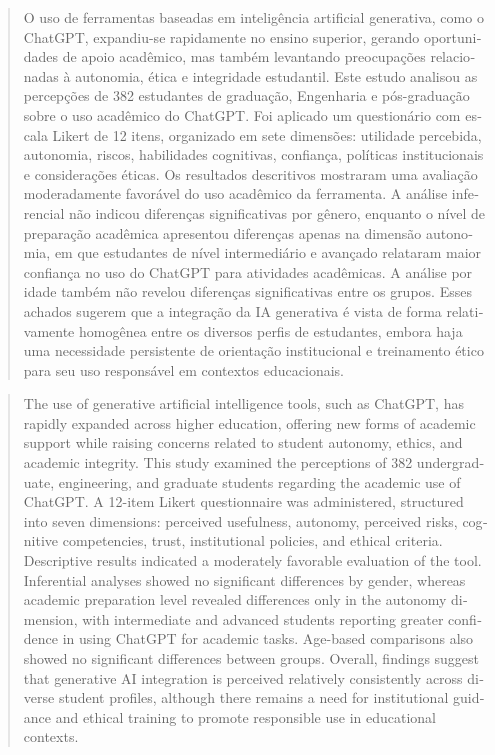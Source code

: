 \documentclass[spanish]{textolivre}
\begin{document}
\begin{polyabstract}
\begin{portuguese}
\begin{abstract}
O uso de ferramentas baseadas em inteligência artificial generativa, como o ChatGPT, expandiu-se rapidamente no ensino superior, gerando oportunidades de apoio acadêmico, mas também levantando preocupações relacionadas à autonomia, ética e integridade estudantil. Este estudo analisou as percepções de 382 estudantes de graduação, Engenharia e pós-graduação sobre o uso acadêmico do ChatGPT. Foi aplicado um questionário com escala Likert de 12 itens, organizado em sete dimensões: utilidade percebida, autonomia, riscos, habilidades cognitivas, confiança, políticas institucionais e considerações éticas. Os resultados descritivos mostraram uma avaliação moderadamente favorável do uso acadêmico da ferramenta. A análise inferencial não indicou diferenças significativas por gênero, enquanto o nível de preparação acadêmica apresentou diferenças apenas na dimensão autonomia, em que estudantes de nível intermediário e avançado relataram maior confiança no uso do ChatGPT para atividades acadêmicas. A análise por idade também não revelou diferenças significativas entre os grupos. Esses achados sugerem que a integração da IA generativa é vista de forma relativamente homogênea entre os diversos perfis de estudantes, embora haja uma necessidade persistente de orientação institucional e treinamento ético para seu uso responsável em contextos educacionais.

\end{abstract}
\end{portuguese}

\begin{english}
\begin{abstract}
The use of generative artificial intelligence tools, such as ChatGPT, has rapidly expanded across higher education, offering new forms of academic support while raising concerns related to student autonomy, ethics, and academic integrity. This study examined the perceptions of 382 undergraduate, engineering, and graduate students regarding the academic use of ChatGPT. A 12-item Likert questionnaire was administered, structured into seven dimensions: perceived usefulness, autonomy, perceived risks, cognitive competencies, trust, institutional policies, and ethical criteria. Descriptive results indicated a moderately favorable evaluation of the tool. Inferential analyses showed no significant differences by gender, whereas academic preparation level revealed differences only in the autonomy dimension, with intermediate and advanced students reporting greater confidence in using ChatGPT for academic tasks. Age-based comparisons also showed no significant differences between groups. Overall, findings suggest that generative AI integration is perceived relatively consistently across diverse student profiles, although there remains a need for institutional guidance and ethical training to promote responsible use in educational contexts.


\end{abstract}
\end{english}
\end{polyabstract}
\end{document}

